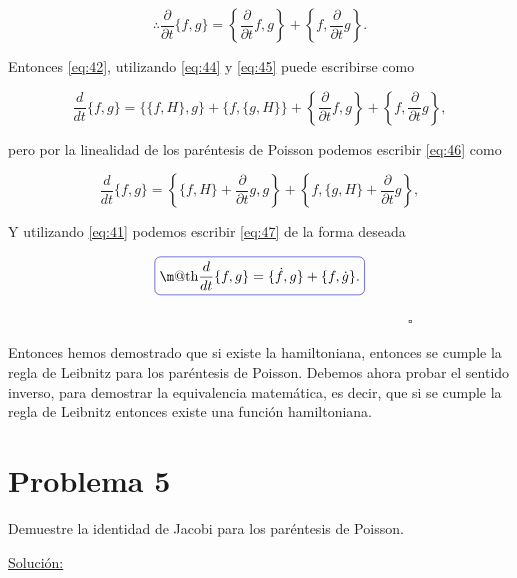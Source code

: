 \documentclass[a4paper,10pt]{article}
\makeatletter
\numberwithin{equation}{section}
\newcommand*{\boxcolor}{blue}
\renewcommand{\boxed}[1]{\textcolor{\boxcolor}{%
\tikz[baseline={([yshift=-1ex]current bounding box.center)}] \node [rectangle, minimum width=1ex,rounded corners,draw] {\normalcolor\m@th$\displaystyle#1$};}}
\makeatother
\begin{document}
\begin{equation}
 \therefore \frac{\partial}{\partial t}\{f,g\} = \left\{\frac{\partial}{\partial t}f,g\right\}
 + \left\{f, \frac{\partial}{\partial t}g\right\}.
 \label{eq:45}
\end{equation}

Entonces \eqref{eq:42}, utilizando \eqref{eq:44} y \eqref{eq:45} puede escribirse como

\begin{equation}
 \frac{d}{dt}\{f,g\} =  \{\{f,H\},g\} + \{f,\{g,H\}\} + \left\{\frac{\partial}{\partial t}f,g\right\}
 + \left\{f, \frac{\partial}{\partial t}g\right\},
 \label{eq:46}
\end{equation}

pero por la linealidad de los paréntesis de Poisson podemos escribir \eqref{eq:46} como

\begin{equation}
  \frac{d}{dt}\{f,g\} = \left\{\{f,H\} + \frac{\partial}{\partial t}g, g\right\} + 
  \left\{f,\{g,H\} + \frac{\partial}{\partial t}g\right\},
  \label{eq:47}
\end{equation}

Y utilizando \eqref{eq:41} podemos escribir \eqref{eq:47} de la forma deseada

\begin{equation}
 \boxed{\frac{d}{dt}\{f,g\} = \{\dot{f},g\} + \{f,\dot{g}\}.}
\end{equation}

$\hspace{12cm} \square$

Entonces hemos demostrado que si existe la hamiltoniana, entonces se cumple la regla 
de Leibnitz para los paréntesis de Poisson. Debemos ahora probar el sentido inverso, 
para demostrar la equivalencia matemática, es decir, que si se cumple la regla de 
Leibnitz entonces existe una función hamiltoniana.


\section{Problema 5}

Demuestre la identidad de Jacobi para los paréntesis de Poisson.

\vspace{.3cm}

\underline{Solución:} \vspace{.3cm}
\end{document}
